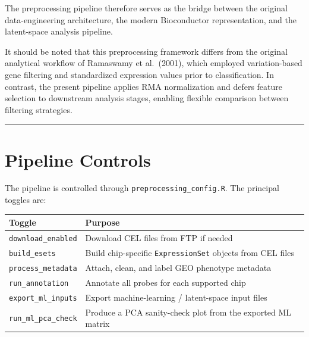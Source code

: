 \documentclass[
  letterpaper,
  DIV=11,
  numbers=noendperiod,
  openany,
  oneside]{scrreprt}
\begin{document}
The preprocessing pipeline therefore serves as the bridge between the
original data-engineering architecture, the modern Bioconductor
representation, and the latent-space analysis pipeline.

It should be noted that this preprocessing framework differs from the
original analytical workflow of Ramaswamy et al.~(2001), which employed
variation-based gene filtering and standardized expression values prior
to classification. In contrast, the present pipeline applies RMA
normalization and defers feature selection to downstream analysis
stages, enabling flexible comparison between filtering strategies.

\begin{center}\rule{0.5\linewidth}{0.5pt}\end{center}

\section*{Pipeline Controls}\label{pipeline-controls}


The pipeline is controlled through \texttt{preprocessing\_config.R}. The
principal toggles are:

\begin{longtable}[]{@{}
  >{\raggedright\arraybackslash}p{}
  >{\raggedright\arraybackslash}p{}@{}}
\toprule\noalign{}
\begin{minipage}[b]{\linewidth}\raggedright
Toggle
\end{minipage} & \begin{minipage}[b]{\linewidth}\raggedright
Purpose
\end{minipage} \\
\midrule\noalign{}
\endhead
\bottomrule\noalign{}
\endlastfoot
\texttt{download\_enabled} & Download CEL files from FTP if needed \\
\texttt{build\_esets} & Build chip-specific \texttt{ExpressionSet}
objects from CEL files \\
\texttt{process\_metadata} & Attach, clean, and label GEO phenotype
metadata \\
\texttt{run\_annotation} & Annotate all probes for each supported
chip \\
\texttt{export\_ml\_inputs} & Export machine-learning / latent-space
input files \\
\texttt{run\_ml\_pca\_check} & Produce a PCA sanity-check plot from the
exported ML matrix \\
\end{longtable}
\end{document}
